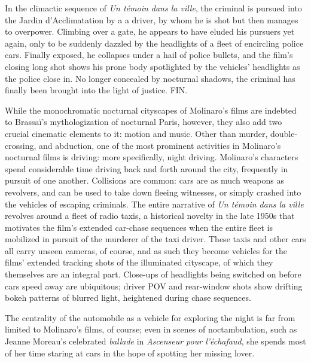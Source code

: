 \documentclass[
  letterpaper,
  DIV=11,
  numbers=noendperiod,
  oneside]{scrartcl}
\begin{document}
In the climactic sequence of \emph{Un témoin dans la ville}, the
criminal is pursued into the Jardin d'Acclimatation by a a driver, by
whom he is shot but then manages to overpower. Climbing over a gate, he
appears to have eluded his pursuers yet again, only to be suddenly
dazzled by the headlights of a fleet of encircling police cars. Finally
exposed, he collapses under a hail of police bullets, and the film's
closing long shot shows his prone body spotlighted by the vehicles'
headlights as the police close in. No longer concealed by nocturnal
shadows, the criminal has finally been brought into the light of
justice. FIN.

\marginnote{\begin{footnotesize}

\end{footnotesize}}

While the monochromatic nocturnal cityscapes of Molinaro's films are
indebted to Brassaï's mythologization of nocturnal Paris, however, they
also add two crucial cinematic elements to it: motion and music. Other
than murder, double-crossing, and abduction, one of the most prominent
activities in Molinaro's nocturnal films is driving: more specifically,
night driving. Molinaro's characters spend considerable time driving
back and forth around the city, frequently in pursuit of one another.
Collisions are common: cars are as much weapons as revolvers, and can be
used to take down fleeing witnesses, or simply crashed into the vehicles
of escaping criminals. The entire narrative of \emph{Un témoin dans la
ville} revolves around a fleet of radio taxis, a historical novelty in
the late 1950s that motivates the film's extended car-chase sequences
when the entire fleet is mobilized in pursuit of the murderer of the
taxi driver. These taxis and other cars all carry unseen cameras, of
course, and as such they become vehicles for the films' extended
tracking shots of the illuminated cityscape, of which they themselves
are an integral part. Close-ups of headlights being switched on before
cars speed away are ubiquitous; driver POV and rear-window shots show
drifting bokeh patterns of blurred light, heightened during chase
sequences.

The centrality of the automobile as a vehicle for exploring the night is
far from limited to Molinaro's films, of course; even in scenes of
noctambulation, such as Jeanne Moreau's celebrated \emph{ballade} in
\emph{Ascenseur pour l'échafaud}, she spends most of her time staring at
cars in the hope of spotting her missing lover.
\end{document}
